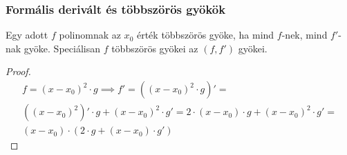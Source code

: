 \subsubsection{Formális derivált és többszörös gyökök}
\begin{theorem}
	Egy adott $f$ polinomnak az $x_0$ érték többszörös gyöke,
	ha mind $f$-nek, mind $f'$-nak gyöke.
	Speciálisan $f$ többszörös gyökei az $(f, f')$ gyökei.
\end{theorem}
\begin{proof}
	\begin{multline*}
		f = (x - x_0)^2 \cdot g \implies
		f' = \left( (x - x_0)^2 \cdot g \right)' = \\
		\left( (x - x_0)^2 \right)' \cdot g + (x - x_0)^2 \cdot g' =
		2 \cdot (x - x_0) \cdot g + (x - x_0)^2 \cdot g' = \\
		(x - x_0) \cdot (2 \cdot g + (x - x_0) \cdot g')
	\end{multline*}
\end{proof}
